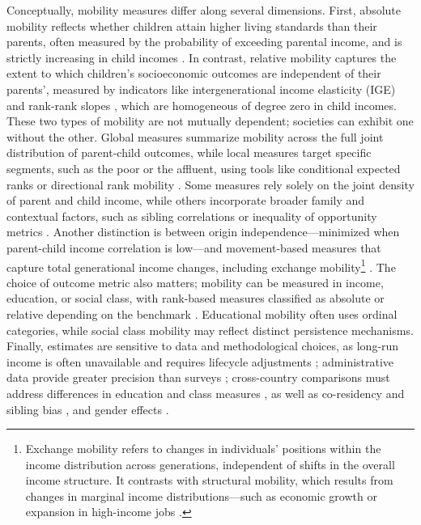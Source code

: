 Conceptually, mobility measures differ along several dimensions. First, absolute mobility reflects whether children attain higher living standards than their parents, often measured by the probability of exceeding parental income, and is strictly increasing in child incomes \citep{narayan2018fair}. In contrast, relative mobility captures the extent to which children's socioeconomic outcomes are independent of their parents', measured by indicators like intergenerational income elasticity (IGE) and rank-rank slopes \citep{clemente2025using}, which are homogeneous of degree zero in child incomes. These two types of mobility are not mutually dependent; societies can exhibit one without the other. Global measures summarize mobility across the full joint distribution of parent-child outcomes, while local measures target specific segments, such as the poor or the affluent, using tools like conditional expected ranks or directional rank mobility \citep{deutscher2023measuring}. Some measures rely solely on the joint density of parent and child income, while others incorporate broader family and contextual factors, such as sibling correlations \citep{bingley2019correlation, solon1991longitudinal} or inequality of opportunity metrics \citep{bjorklund2012equality, mitnik2020inequality, peragine2015individual}. Another distinction is between origin independence---minimized when parent-child income correlation is low---and movement-based measures that capture total generational income changes, including exchange mobility\footnote{Exchange mobility refers to changes in individuals' positions within the income distribution across generations, independent of shifts in the overall income structure. It contrasts with structural mobility, which results from changes in marginal income distributions---such as economic growth or expansion in high-income jobs \citep{deutscher2023measuring}.} \citep{ray2023measuring}. The choice of outcome metric also matters; mobility can be measured in income, education, or social class, with rank-based measures classified as absolute or relative depending on the benchmark \citep{blanden2013cross}. Educational mobility often uses ordinal categories, while social class mobility may reflect distinct persistence mechanisms. Finally, estimates are sensitive to data and methodological choices, as long-run income is often unavailable and requires lifecycle adjustments \citep{blanden2013cross, clemente2025using}; administrative data provide greater precision than surveys \citep{ray2023measuring}; cross-country comparisons must address differences in education and class measures \citep{blanden2013cross}, as well as co-residency and sibling bias \citep{ahsan2025making}, and gender effects \citep{hu2023gender}.

